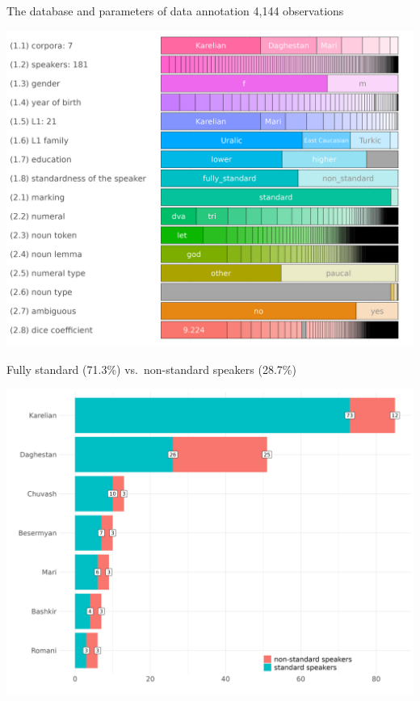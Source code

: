 \documentclass[
  ignorenonframetext,
  t]{beamer}
\begin{document}
\begin{frame}{The database and parameters of data annotation}
\label{the-database-and-parameters-of-data-annotation}
4,144 observations

\begin{center}
\includegraphics[width=9in,height=0.84\textheight]{images/l2_num_constr_df_structure.png}
\end{center}
\end{frame}

\begin{frame}{Fully standard (71.3\%) vs.~non-standard speakers
(28.7\%)}
\label{fully-standard-71.3-vs.-non-standard-speakers-28.7}
\begin{center}
\includegraphics[width=12in,height=0.93\textheight]{images/l2_num_constr_distribution_of_speakers_by_standardness_across_corpora.png}
\end{center}
\end{frame}
\end{document}
